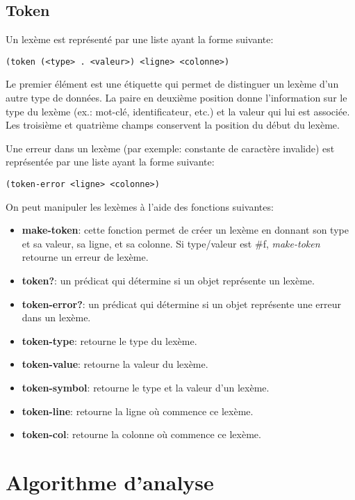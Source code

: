 \documentclass[11pt]{report}
\begin{document}
\subsection{Token}

Un lexème est représenté par une liste ayant la forme suivante:

\begin{verbatim}
(token (<type> . <valeur>) <ligne> <colonne>)
\end{verbatim}

Le premier élément est une étiquette qui permet de distinguer un
lexème d'un autre type de données.  La paire en deuxième position
donne l'information sur le type du lexème (ex.: mot-clé,
identificateur, etc.) et la valeur qui lui est associée.  Les
troisième et quatrième champs conservent la position du début du
lexème.

Une erreur dans un lexème (par exemple: constante de caractère
invalide) est représentée par une liste ayant la forme suivante:

\begin{verbatim}
(token-error <ligne> <colonne>)
\end{verbatim}


On peut manipuler les lexèmes à l'aide des fonctions suivantes:

\begin{itemize}
\item {\bf make-token}: cette fonction permet de créer un lexème en
  donnant son type et sa valeur, sa ligne, et sa colonne.  Si
  type/valeur est \#f, \emph{make-token} retourne un erreur de lexème.
\item {\bf token?}: un prédicat qui détermine si un objet représente
  un lexème.
\item {\bf token-error?}: un prédicat qui détermine si un objet
  représente une erreur dans un lexème.
\item {\bf token-type}: retourne le type du lexème.
\item {\bf token-value}: retourne la valeur du lexème.
\item {\bf token-symbol}: retourne le type et la valeur d'un lexème.
\item {\bf token-line}: retourne la ligne où commence ce lexème.
\item {\bf token-col}: retourne la colonne où commence ce lexème.
\end{itemize}

\section{Algorithme d'analyse}
\end{document}

